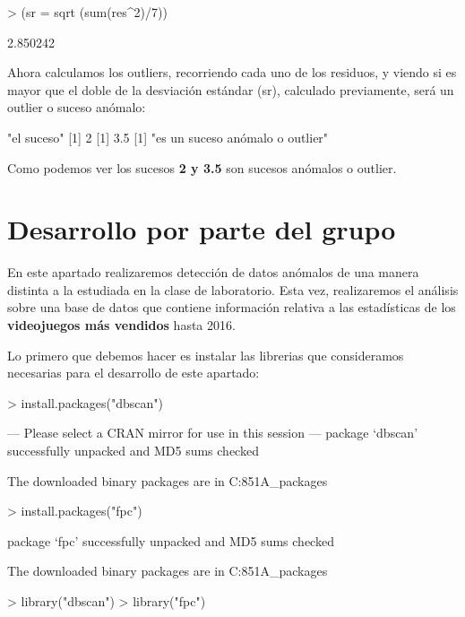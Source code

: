 \documentclass [a4paper] {article}
\begin{document}
\begin{Schunk}
\begin{Sinput}
> (sr = sqrt (sum(res^2)/7))
\end{Sinput}
\begin{Soutput}
[1] 2.850242
\end{Soutput}
\end{Schunk}

Ahora calculamos los outliers, recorriendo cada uno de los residuos, y viendo si es mayor que el doble de la
desviación estándar (sr), calculado previamente, será un outlier o suceso anómalo:

\begin{Schunk}
\begin{Soutput}
[1] "el suceso"
[1] 2
[1] 3.5
[1] "es un suceso anómalo o outlier"
\end{Soutput}
\end{Schunk}

Como podemos ver los sucesos \textbf{2 y 3.5} son sucesos anómalos o outlier.

\section{Desarrollo por parte del grupo}

En este apartado realizaremos detección de datos anómalos de una manera distinta a la estudiada en la clase
de laboratorio. Esta vez, realizaremos el análisis sobre una base de datos que contiene información relativa
a las estadísticas de los \textbf{videojuegos más vendidos} hasta 2016. 

Lo primero que debemos hacer es instalar las librerias que consideramos necesarias para el desarrollo de
este apartado:

\begin{Schunk}
\begin{Sinput}
> install.packages("dbscan")
\end{Sinput}
\begin{Soutput}
--- Please select a CRAN mirror for use in this session ---
package ‘dbscan’ successfully unpacked and MD5 sums checked

The downloaded binary packages are in
	C:\Users{}\AppData\Local\Temp\RtmpcP851A\downloaded_packages
\end{Soutput}
\begin{Sinput}
> install.packages("fpc")
\end{Sinput}
\begin{Soutput}
package ‘fpc’ successfully unpacked and MD5 sums checked

The downloaded binary packages are in
	C:\Users{}\AppData\Local\Temp\RtmpcP851A\downloaded_packages
\end{Soutput}
\begin{Sinput}
> library("dbscan")
> library("fpc")
\end{Sinput}
\end{Schunk}
\end{document}
